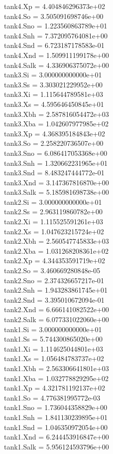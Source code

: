 tank4.Xp = 4.404846296373e+02\\
tank4.So = 3.505091698746e+00\\
tank4.Sno = 1.223560863789e+01\\
tank4.Snh = 7.372095764081e+00\\
tank4.Snd = 6.723187178583e-01\\
tank4.Xnd = 1.509911199178e+00\\
tank4.Salk = 4.336906375072e+00\\
tank3.Si = 3.000000000000e+01\\
tank3.Ss = 3.303021229952e+00\\
tank3.Xi = 1.115644789581e+03\\
tank3.Xs = 4.595646450845e+01\\
tank3.Xbh = 2.587816054472e+03\\
tank3.Xba = 1.042607977985e+02\\
tank3.Xp = 4.368395184843e+02\\
tank3.So = 2.258220736507e+00\\
tank3.Sno = 6.086417053368e+00\\
tank3.Snh = 1.320662231965e+01\\
tank3.Snd = 8.483247444772e-01\\
tank3.Xnd = 3.147367816870e+00\\
tank3.Salk = 5.185981698738e+00\\
tank2.Si = 3.000000000000e+01\\
tank2.Ss = 2.963119860782e+00\\
tank2.Xi = 1.115525591261e+03\\
tank2.Xs = 1.047623215724e+02\\
tank2.Xbh = 2.560547745833e+03\\
tank2.Xba = 1.031268208361e+02\\
tank2.Xp = 4.344353591719e+02\\
tank2.So = 3.460669280848e-05\\
tank2.Sno = 2.374326657217e-01\\
tank2.Snh = 1.943283861745e+01\\
tank2.Snd = 3.395010672094e-01\\
tank2.Xnd = 6.666141082522e+00\\
tank2.Salk = 6.077331022060e+00\\
tank1.Si = 3.000000000000e+01\\
tank1.Ss = 5.744300865020e+00\\
tank1.Xi = 1.114625044801e+03\\
tank1.Xs = 1.056484783737e+02\\
tank1.Xbh = 2.563306641801e+03\\
tank1.Xba = 1.032778829295e+02\\
tank1.Xp = 4.321781192137e+02\\
tank1.So = 4.776381995772e-03\\
tank1.Sno = 1.736044358829e+00\\
tank1.Snh = 1.841130239895e+01\\
tank1.Snd = 1.046350972054e+00\\
tank1.Xnd = 6.244453916847e+00\\
tank1.Salk = 5.956124593796e+00\\
